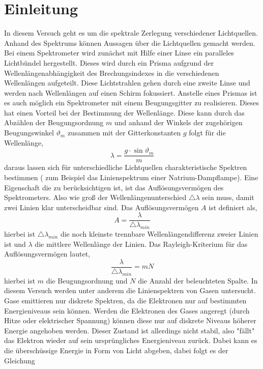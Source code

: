 \section{Einleitung}
In diesem Versuch geht es um die spektrale Zerlegung verschiedener Lichtquellen. Anhand des Spektrums können Aussagen über die Lichtquellen gemacht werden.
Bei einem Spektrometer wird zunächst mit Hilfe einer Linse ein paralleles Lichtbündel hergestellt. Dieses wird durch ein Prisma aufgrund der Wellenlängenabhängigkeit des Brechungsindexes in die verschiedenen Wellenlängen aufgeteilt. Diese Lichtstrahlen gehen durch eine zweite Linse und werden nach Wellenlängen auf einen Schirm fokussiert.
Anstelle eines Prismas ist es auch möglich ein Spektrometer mit einem Beugungsgitter zu realisieren. Dieses hat einen Vorteil bei der Bestimmung der Wellenlänge. Diese kann durch das Abzählen der Beugungsordnung $ \textit{m} $ und anhand der Winkels der zugehörigen Beugungswinkel $ \vartheta_{m} $ zusammen mit der Gitterkonstanten $ \textit{g} $ folgt für die Wellenlänge,
\begin{equation}
\lambda=\frac{g\cdot\sin \vartheta_{m}}{m} \label{Wellenlänge}
\end{equation}
daraus lassen sich für unterschiedliche Lichtquellen charakteristische Spektren bestimmen ( zum Beispiel das Linienspektrum einer Natrium-Dampflampe). 
Eine Eigenschaft die zu berücksichtigen ist, ist das Auflösungsvermögen des Spektrometers.
Also wie groß der Wellenlängenunterschied $ \triangle\lambda $ sein muss, damit zwei Linien klar unterscheidbar sind.
Das Auflösungsvermögen $ \textit{A} $ ist definiert als,
\begin{equation}
A=\frac{\lambda}{\triangle\lambda_{min}}
\end{equation}
hierbei ist $ \triangle\lambda_{min} $ die noch kleinste trennbare Wellenlängendifferenz zweier Linien ist und $ \lambda $ die mittlere Wellenlänge der Linien.
Das Rayleigh-Kriterium für das Auflösungsvermögen lautet,
\begin{equation}
\frac{\lambda}{\triangle\lambda_{min}}=mN
\end{equation}
hierbei ist $ \textit{m} $ die Beugungsordnung und  $ \textit{N} $ die Anzahl der beleuchteten Spalte.
In diesem Versuch werden unter anderem die Linienspektren von Gasen untersucht.
Gase emittieren nur diskrete Spektren, da die Elektronen nur auf bestimmten Energieniveaus sein können. Werden die Elektronen des Gases angeregt (durch Hitze oder elektrischer Spannung) können diese nur auf diskrete Niveaus höherer Energie angehoben werden. Dieser Zustand ist allerdings nicht stabil, also "fällt" das Elektron wieder auf sein ursprüngliches Energieniveau zurück. Dabei kann es die überschüssige Energie in Form von Licht abgeben, dabei folgt es der Gleichung
